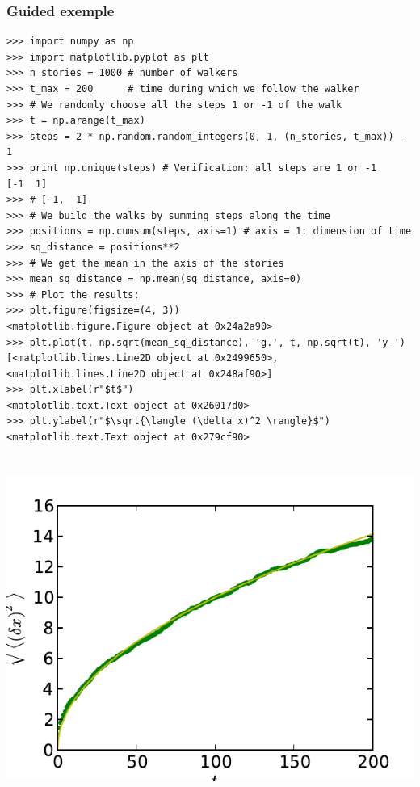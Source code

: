 \documentclass[colorlinks]{beamer}
\begin{document}
\begin{frame}[fragile]\frametitle{Guided exemple}
\tiny
\begin{verbatim}
>>> import numpy as np
>>> import matplotlib.pyplot as plt
>>> n_stories = 1000 # number of walkers
>>> t_max = 200      # time during which we follow the walker
>>> # We randomly choose all the steps 1 or -1 of the walk
>>> t = np.arange(t_max)
>>> steps = 2 * np.random.random_integers(0, 1, (n_stories, t_max)) - 1
>>> print np.unique(steps) # Verification: all steps are 1 or -1
[-1  1]
>>> # [-1,  1]
>>> # We build the walks by summing steps along the time
>>> positions = np.cumsum(steps, axis=1) # axis = 1: dimension of time
>>> sq_distance = positions**2
>>> # We get the mean in the axis of the stories
>>> mean_sq_distance = np.mean(sq_distance, axis=0)
>>> # Plot the results:
>>> plt.figure(figsize=(4, 3))
<matplotlib.figure.Figure object at 0x24a2a90>
>>> plt.plot(t, np.sqrt(mean_sq_distance), 'g.', t, np.sqrt(t), 'y-')
[<matplotlib.lines.Line2D object at 0x2499650>, <matplotlib.lines.Line2D object at 0x248af90>]
>>> plt.xlabel(r"$t$")
<matplotlib.text.Text object at 0x26017d0>
>>> plt.ylabel(r"$\sqrt{\langle (\delta x)^2 \rangle}$")
<matplotlib.text.Text object at 0x279cf90>
\end{verbatim}

\end{frame}

\begin{frame}[fragile]\frametitle{}
\begin{columns}[c]

\includegraphics[width=\textwidth]{plwfigis/CursP_2_figure8}


\end{columns}
\end{frame}
\end{document}
